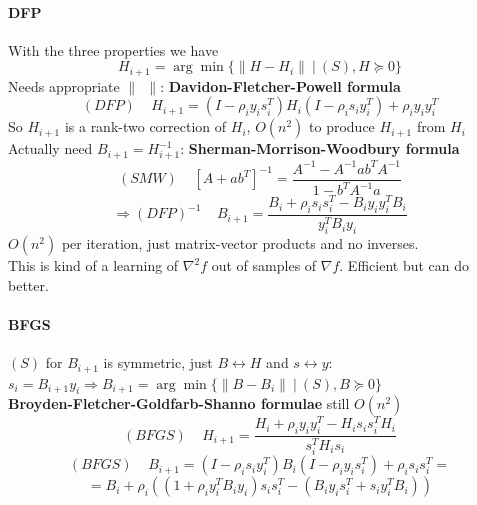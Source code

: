 \documentclass[10pt]{report}
\begin{document}
\paragraph{DFP} With the three properties we have $$H_{i+1} = \arg\min\{\|H-H_i\|\:|\:(S), H\succeq 0\}$$
Needs appropriate $\|\:\:\|$: \textbf{Davidon-Fletcher-Powell formula}
	$$(DFP)\:\:\:\:\:H_{i+1} = (I - \rho_iy_is_i^T)H_i(I-\rho_is_iy_i^T)+\rho_iy_iy_i^T$$
So $H_{i+1}$ is a rank-two correction of $H_i$, $O(n^2)$ to produce $H_{i+1}$ from $H_i$\\
Actually need $B_{i+1} = H_{i+1}^{-1}$: \textbf{Sherman-Morrison-Woodbury formula}
$$(SMW)\:\:\:\:\:[A+ab^T]^{-1} = \frac{\displaystyle A^{-1} - A^{-1}ab^TA^{-1}}{\displaystyle 1-b^TA^{-1}a}$$
$$\Rightarrow (DFP)^{-1}\:\:\:\:\:B_{i+1} = \frac{\displaystyle B_i + \rho_is_is_i^T - B_iy_iy_i^TB_i}{\displaystyle y_i^TB_iy_i}$$
$O(n^2)$ per iteration, just matrix-vector products and no inverses.\\
This is kind of a learning of $\nabla^2 f$ out of samples of $\nabla f$. Efficient but can do better.
\paragraph{BFGS} $(S)$ for $B_{i+1}$ is symmetric, just $B \leftrightarrow H$ and $s \leftrightarrow y$: $s_i = B_{i+1}y_i \Rightarrow B_{i+1} = \arg\min\{\|B-B_i\|\:|\:(S),B\succeq 0\}$\\
\textbf{Broyden-Fletcher-Goldfarb-Shanno formulae} still $O(n^2)$
	$$(BFGS)\:\:\:\:\:H_{i+1} = \frac{\displaystyle H_i + \rho_iy_iy_i^T - H_is_is_i^TH_i}{\displaystyle s_i^TH_is_i}$$
	$$(BFGS)\:\:\:\:\:B_{i+1} = (I-\rho_is_iy_i^T)B_i(I-\rho_iy_is_i^T)+\rho_is_is_i^T=$$ $$= B_i+\rho_i((1+\rho_iy_i^TB_iy_i)s_is_i^T - (B_iy_is_i^T+s_iy_i^TB_i))$$
\end{document}
